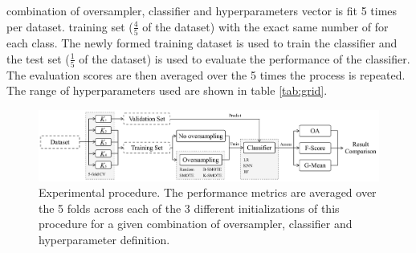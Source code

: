 \documentclass[remotesensing,article,submit,moreauthors,pdftex]{Definitions/mdpi}
\begin{document}
\begin{paracol}{2}
 combination
of oversampler, classifier and hyperparameters vector is fit 5 times
 per dataset.  training set
($\frac{4}{5}$ of the dataset)   with the exact same number of  for
each class. The newly formed training dataset is used to train the classifier
and the test set ($\frac{1}{5}$ of the dataset)
is used to evaluate the performance of the classifier. The evaluation scores
are then averaged over the 5 times the process is repeated. The range of
hyperparameters used are shown in table \ref{tab:grid}. 

\end{paracol}
\begin{figure}
	\centering
    \captionsetup{justification=centering}
    \caption{Experimental procedure. The performance metrics are averaged over
    the 5 folds across each of the 3 different initializations of this
    procedure for a given combination of oversampler, classifier and
    hyperparameter definition.
    \vspace{.25cm}}\label{fig:experiment_pipeline}
	\includegraphics[width=1\linewidth]{../analysis/experiment_pipeline}
\end{figure}
\begin{paracol}{2}
\linenumbers
\switchcolumn

\end{paracol}
\end{document}
